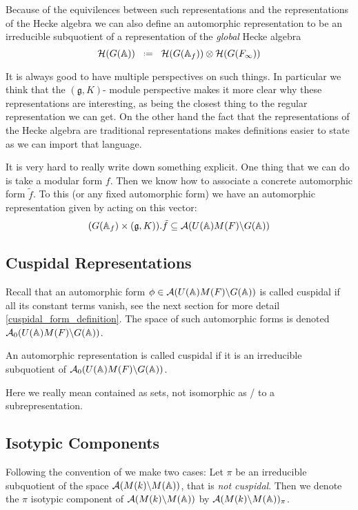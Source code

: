 Because of the equivilences between such representations and the representations of the Hecke algebra we can also define an automorphic representation to be an irreducible subquotient of a representation of the \textit{global} Hecke algebra
\[\mathcal{H}(G(\A)) \defeq \mathcal{H}(G(\A_f)) \tensor \mathcal{H}(G(F_\infty))\]

It is always good to have multiple perspectives on such things. In particular we think that the \((\mathfrak{g}, K)\)- module perspective makes it more clear why these representations are interesting, as being the closest thing to the regular representation we can get. On the other hand the fact that the representations of the Hecke algebra are traditional representations makes definitions easier to state as we can import that language. 

\begin{example}
    It is very hard to really write down something explicit. One thing that we can do is take a modular form \(f\). Then we know how to associate a concrete automorphic form \(\tilde{f}\). To this (or any fixed automorphic form) we have an automorphic representation given by acting on this vector:
    \[(G(\A_f)\times (\mathfrak{g}, K)).\tilde{f} \subseteq \mathcal{A}(U(\A)M(F)\backslash G(\A))\]
\end{example}

\subsection{Cuspidal Representations}
Recall that an automorphic form \(\phi\in \mathcal{A}(U(\A)M(F) \backslash G(\A))\) is called cuspidal  if all its constant terms vanish, see the next section for more detail \ref{cuspidal_form_definition}.
The space of such automorphic forms is denoted \(\mathcal{A}_0(U(\A)M(F) \backslash G(\A))\). 

An automorphic representation is called cuspidal if it is an irreducible subquotient of \(\mathcal{A}_0(U(\A)M(F) \backslash G(\A))\).

\begin{Remark}
    Here we really mean contained as sets, not isomorphic as / to a subrepresentation.
\end{Remark}

\subsection{Isotypic Components}
Following the convention of \cite[II.1]{moeglinSpectralDecompositionEisenstein1995} we make two cases:
Let \(\pi\) be an irreducible subquotient of the space \(\mathcal{A}(M(k) \backslash M(\A))\), that is \textit{not cuspidal}. Then we denote the \(\pi\) isotypic component of \(\mathcal{A}(M(k) \backslash M(\A))\) by \(\mathcal{A}(M(k) \backslash M(\A))_\pi\).

